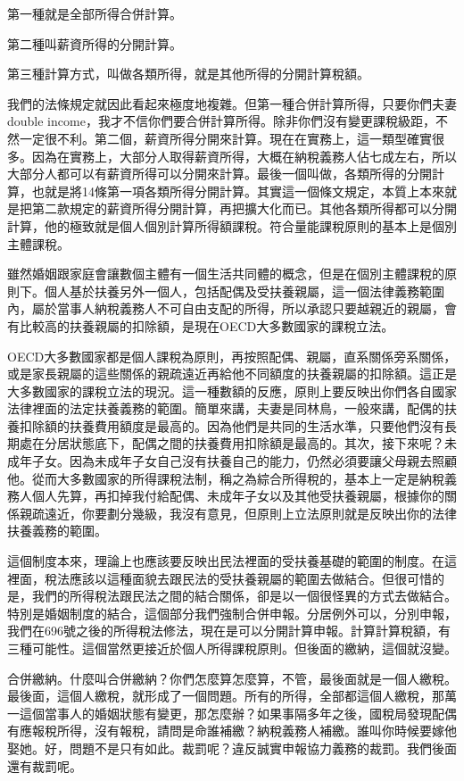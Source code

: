 \documentclass[]{ctexbook}
\begin{document}
第一種就是全部所得合併計算。

第二種叫薪資所得的分開計算。

第三種計算方式，叫做各類所得，就是其他所得的分開計算稅額。

我們的法條規定就因此看起來極度地複雜。但第一種合併計算所得，只要你們夫妻double income，我才不信你們要合併計算所得。除非你們沒有變更課稅級距，不然一定很不利。第二個，薪資所得分開來計算。現在在實務上，這一類型確實很多。因為在實務上，大部分人取得薪資所得，大概在納稅義務人佔七成左右，所以大部分人都可以有薪資所得可以分開來計算。最後一個叫做，各類所得的分開計算，也就是將14條第一項各類所得分開計算。其實這一個條文規定，本質上本來就是把第二款規定的薪資所得分開計算，再把擴大化而已。其他各類所得都可以分開計算，他的極致就是個人個別計算所得額課稅。符合量能課稅原則的基本上是個別主體課稅。

雖然婚姻跟家庭會讓數個主體有一個生活共同體的概念，但是在個別主體課稅的原則下。個人基於扶養另外一個人，包括配偶及受扶養親屬，這一個法律義務範圍內，屬於當事人納稅義務人不可自由支配的所得，所以承認只要越親近的親屬，會有比較高的扶養親屬的扣除額，是現在OECD大多數國家的課稅立法。

OECD大多數國家都是個人課稅為原則，再按照配偶、親屬，直系關係旁系關係，或是家長親屬的這些關係的親疏遠近再給他不同額度的扶養親屬的扣除額。這正是大多數國家的課稅立法的現況。這一種數額的反應，原則上要反映出你們各自國家法律裡面的法定扶養義務的範圍。簡單來講，夫妻是同林鳥，一般來講，配偶的扶養扣除額的扶養費用額度是最高的。因為他們是共同的生活水準，只要他們沒有長期處在分居狀態底下，配偶之間的扶養費用扣除額是最高的。其次，接下來呢？未成年子女。因為未成年子女自己沒有扶養自己的能力，仍然必須要讓父母親去照顧他。從而大多數國家的所得課稅法制，稱之為綜合所得稅的，基本上一定是納稅義務人個人先算，再扣掉我付給配偶、未成年子女以及其他受扶養親屬，根據你的關係親疏遠近，你要劃分幾級，我沒有意見，但原則上立法原則就是反映出你的法律扶養義務的範圍。

這個制度本來，理論上也應該要反映出民法裡面的受扶養基礎的範圍的制度。在這裡面，稅法應該以這種面貌去跟民法的受扶養親屬的範圍去做結合。但很可惜的是，我們的所得稅法跟民法之間的結合關係，卻是以一個很怪異的方式去做結合。特別是婚姻制度的結合，這個部分我們強制合併申報。分居例外可以，分別申報，我們在696號之後的所得稅法修法，現在是可以分開計算申報。計算計算稅額，有三種可能性。這個當然更接近於個人所得課稅原則。但後面的繳納，這個就沒變。

合併繳納。什麼叫合併繳納？你們怎麼算怎麼算，不管，最後面就是一個人繳稅。最後面，這個人繳稅，就形成了一個問題。所有的所得，全部都這個人繳稅，那萬一這個當事人的婚姻狀態有變更，那怎麼辦？如果事隔多年之後，國稅局發現配偶有應報稅所得，沒有報稅，請問是命誰補繳？納稅義務人補繳。誰叫你時候要嫁他娶她。好，問題不是只有如此。裁罰呢？違反誠實申報協力義務的裁罰。我們後面還有裁罰呢。
\end{document}
